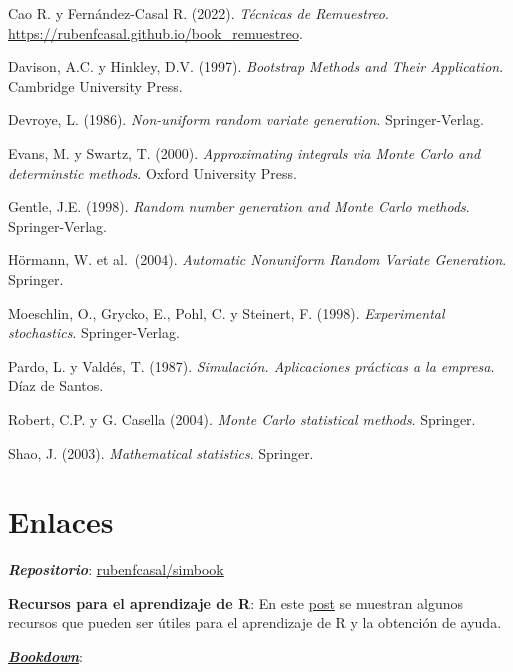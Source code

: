 \documentclass[
]{book}
\theoremstyle{break}
\theoremstyle{nonumberplain}
\begin{document}
Cao R. y Fernández-Casal R. (2022). \emph{Técnicas de Remuestreo}. \url{https://rubenfcasal.github.io/book_remuestreo}.

Davison, A.C. y Hinkley, D.V. (1997). \emph{Bootstrap Methods and Their Application}. Cambridge University Press.

Devroye, L. (1986). \emph{Non-uniform random variate generation}. Springer-Verlag.

Evans, M. y Swartz, T. (2000). \emph{Approximating integrals via Monte Carlo and determinstic methods}. Oxford University Press.

Gentle, J.E. (1998). \emph{Random number generation and Monte Carlo methods}. Springer-Verlag.

Hörmann, W. et al.~(2004). \emph{Automatic Nonuniform Random Variate Generation}. Springer.

Moeschlin, O., Grycko, E., Pohl, C. y Steinert, F. (1998). \emph{Experimental stochastics}. Springer-Verlag.

Pardo, L. y Valdés, T. (1987). \emph{Simulación. Aplicaciones prácticas a la empresa}. Díaz de Santos.

Robert, C.P. y G. Casella (2004). \emph{Monte Carlo statistical methods}. Springer.

Shao, J. (2003). \emph{Mathematical statistics}. Springer.

\hypertarget{links}{%
\section*{Enlaces}\label{links}}

\textbf{\emph{Repositorio}}: \href{https://github.com/rubenfcasal/simbook}{rubenfcasal/simbook}

\textbf{Recursos para el aprendizaje de R}: En este \href{https://rubenfcasal.github.io/post/ayuda-y-recursos-para-el-aprendizaje-de-r}{post} se muestran algunos recursos que pueden ser útiles para el aprendizaje de R y la obtención de ayuda.

\href{https://bookdown.org}{\textbf{\emph{Bookdown}}}:
\end{document}
